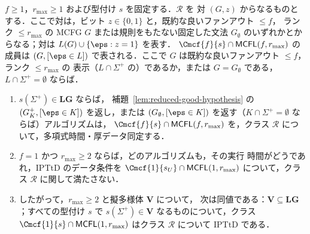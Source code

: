 \begin{corollary}
\label{cor:iptd}
$f\ge1$，$r_{\max}\ge1$ および型付け $s$ を固定する．$\mathcal R$ を
対 $(G,z)$ からなるものとする．ここで対は，ビット $z\in\{0,1\}$ と，既約な良いファンアウト $\le f$，
ランク $\le r_{\max}$ の MCFG $G$ または規則をもたない固定した文法 $G_\emptyset$ のいずれかとからなる；対は
$L(G)\cup\{\eps:z=1\}$ を表す．
$\Cmcf{f}{s}\cap\mathsf{MCFL}(f,r_{\max})$ の成員は
$(G,[\eps\in L])$ で表される．ここで $G$ は既約な良いファンアウト $\le f$，ランク $\le r_{\max}$ の
表示（$L\cap\Sigma^+$ の）であるか，または $G=G_\emptyset$ である，$L\cap\Sigma^+=\emptyset$ ならば．
\begin{enumerate}[label=\textup{(\roman*)},leftmargin=*]
\item $s(\Sigma^+)\in\mathbf{LG}$ ならば，
補題~\ref{lem:reduced-good-hypothesis} の $(G^+_K,[\eps\in K])$ を返し，または
$(G_\emptyset,[\eps\in K])$ を返す（$K\cap\Sigma^+=\emptyset$ ならば）アルゴリズムは，
$\Cmcf{f}{s}\cap\mathsf{MCFL}(f,r_{\max})$ を，クラス $\mathcal R$ について，多項式時間・厚データ同定する．
\item $f=1$ かつ $r_{\max}\ge2$ ならば，どのアルゴリズムも，その実行
時間がどうであれ，IPTtD のデータ条件を
$\Cmcf{1}{s_U}\cap\mathsf{MCFL}(1,r_{\max})$ について，クラス $\mathcal R$ に関して満たさない．
\item したがって，$r_{\max}\ge2$ と擬多様体 $\mathbf V$ について，
次は同値である：$\mathbf V\subseteq\mathbf{LG}$；すべての型付け $s$
で $s(\Sigma^+)\in\mathbf V$ なるものについて，クラス
$\Cmcf{1}{s}\cap\mathsf{MCFL}(1,r_{\max})$ はクラス $\mathcal R$ について IPTtD である．
\end{enumerate}
\end{corollary}

